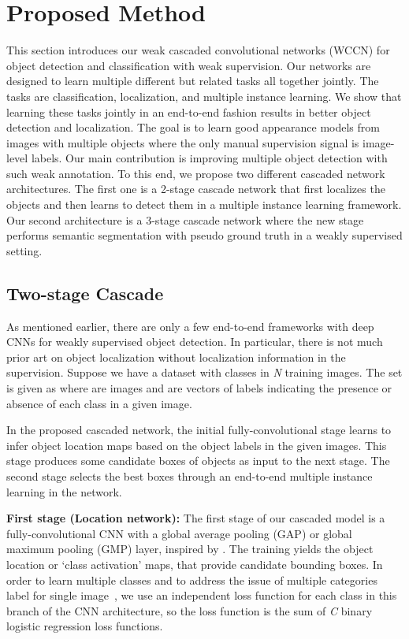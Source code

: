 \documentclass[10pt,twocolumn,letterpaper]{article}
\begin{document}
\section{Proposed Method}

This section introduces our weak cascaded convolutional networks (WCCN) for object detection and classification with weak supervision. Our networks are designed to learn multiple different but related tasks all together jointly. The tasks are classification, localization, and multiple instance learning. We show that learning these tasks jointly in an end-to-end fashion results in better object detection and localization. The goal is to learn good appearance models from images with multiple objects where the only manual supervision signal is image-level labels. Our main contribution is improving multiple object detection with such weak annotation. To this end, we propose two different cascaded network architectures. The first one is a 2-stage cascade network that first localizes the objects and then learns to detect them in a multiple instance learning framework. Our second architecture is a 3-stage cascade network where the new stage performs semantic segmentation with pseudo ground truth in a weakly supervised setting.

\subsection{Two-stage Cascade}
As mentioned earlier, there are only a few end-to-end frameworks with deep CNNs for weakly supervised object detection. In particular, there is not much prior art on object localization without localization information in the supervision. 
Suppose we have a dataset  with  classes in \textit{N} training images. The set is given as  where  are images and  are vectors of labels indicating the presence or absence of each class in a given image.

In the proposed cascaded network, the initial fully-convolutional stage learns to infer object location maps based on the object labels in the given images. This stage produces some candidate boxes of objects as input to the next stage. The second stage selects the best boxes through an end-to-end multiple instance learning in the network. 

\textbf{First stage (Location network):} The first stage of our cascaded model is a fully-convolutional CNN with a global average pooling (GAP) or global maximum pooling (GMP) layer, inspired by \cite{gap_paper}. The training yields the object location or `class activation' maps, that provide candidate bounding boxes. 
In order to learn multiple classes and to address the issue of multiple categories label for single image~\cite{laptev15}, we use an independent loss function for each class in this branch of the CNN architecture, so the loss function is the sum of \textit{C} binary logistic regression loss functions.
\end{document}
